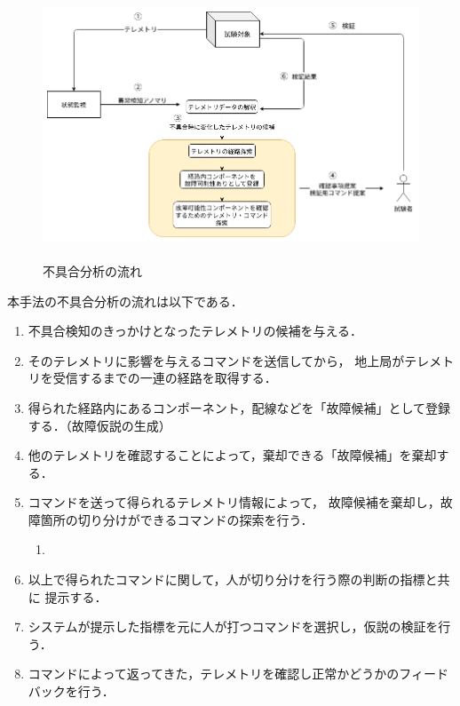 \documentclass[11pt]{article}
\begin{document}
\begin{figure}[H]
   \centering
      \includegraphics[height=8.0cm]{figure/fault_diagnosis_flow.png}
      \caption{不具合分析の流れ}
      \label{fig:fault_diagnosis}
\end{figure}


本手法の不具合分析の流れは以下である．
\begin{enumerate}
   \item 不具合検知のきっかけとなったテレメトリの候補を与える．
   \item そのテレメトリに影響を与えるコマンドを送信してから，
   地上局がテレメトリを受信するまでの一連の経路を取得する．
   \item 得られた経路内にあるコンポーネント，配線などを「故障候補」として登録する．（故障仮説の生成）
   \item 他のテレメトリを確認することによって，棄却できる「故障候補」を棄却する．
   \item コマンドを送って得られるテレメトリ情報によって，
   故障候補を棄却し，故障箇所の切り分けができるコマンドの探索を行う．
   \begin{enumerate}
      \item 
   \end{enumerate}
   \item 以上で得られたコマンドに関して，人が切り分けを行う際の判断の指標と共に
   提示する．
   \item システムが提示した指標を元に人が打つコマンドを選択し，仮説の検証を行う．
   \item コマンドによって返ってきた，テレメトリを確認し正常かどうかのフィードバックを行う．
\end{enumerate}
\end{document}
